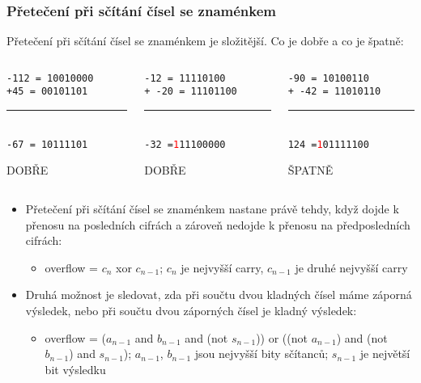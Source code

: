 \documentclass{beamer}
\begin{document}
\begin{frame}
\frametitle{Přetečení při sčítání čísel se znaménkem}

Přetečení při sčítání čísel se znaménkem je složitější. Co je dobře a co je špatně:
\bigskip
\begin{columns}
\begin{column}{0.3\textwidth}
\texttt{-112 = 10010000}\\
\texttt{+\phantom{x}45 = 00101101}\\
\vspace{-8pt}
\rule[0pt]{3cm}{0.1pt}\\
\texttt{\phantom{x}-67 = 10111101}\\
\begin{center}
\large DOBŘE
\end{center}
\end{column}
\hfill
\begin{column}{0.3\textwidth}
\texttt{\phantom{xx}-12 = 11110100}\\
\texttt{+ -20 = 11101100}\\
\vspace{-8pt}
\rule[0pt]{3cm}{0.1pt}\\
\texttt{\phantom{xx}-32 =\textcolor{red}{1}11100000}\\
\begin{center}
\large DOBŘE
\end{center}
\end{column}
\hfill
\begin{column}{0.3\textwidth}
\texttt{\phantom{xx}-90 = 10100110}\\
\texttt{+ -42 = 11010110}\\
\vspace{-8pt}
\rule[0pt]{3cm}{0.1pt}\\
\texttt{\phantom{xx}124 =\textcolor{red}{1}01111100}\\
\begin{center}
\large ŠPATNĚ
\end{center}
\end{column}
\end{columns}
\bigskip
\begin{itemize}
\item Přetečení při sčítání čísel se znaménkem nastane právě tehdy, když dojde k přenosu na posledních cifrách a zároveň nedojde k přenosu na předposledních cifrách:
\begin{itemize}
\item overflow = $c_n$ xor $c_{n-1}$; $c_n$ je nejvyšší carry, $c_{n-1}$ je druhé nejvyšší carry
\end{itemize}
\item Druhá možnost je sledovat, zda při součtu dvou kladných čísel máme záporná výsledek, nebo při součtu dvou záporných čísel je kladný výsledek:
\begin{itemize}
\item overflow = ($a_{n-1}$ and  $b_{n-1}$ and (not $s_{n-1}$)) or ((not $a_{n-1}$) and  (not $b_{n-1}$) and $s_{n-1}$); $a_{n-1}$, $b_{n-1}$ jsou nejvyšší bity sčítanců; $s_{n-1}$ je největší bit výsledku
\end{itemize}
\end{itemize}
\end{frame}
\end{document}
